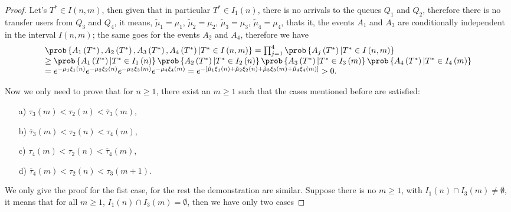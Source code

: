 \begin{proof}
Let's $T^{*}\in I\left(n,m\right)$, then given that in particular $T^{*}\in I_{1}\left(n\right)$, there is no arrivals to the queues $Q_{1}$ and $Q_{2}$, therefore there is no transfer users from $Q_{3}$ and $Q_{4}$, it means, $\tilde{\mu}_{1}=\mu_{1}$, $\tilde{\mu}_{2}=\mu_{2}$, $\tilde{\mu}_{3}=\mu_{3}$, $\tilde{\mu}_{4}=\mu_{4}$, thats it, the events $A_{1}$ and $A_{3}$ are conditionally independent in the interval $I\left(n,m\right)$; the same goes for the events $A_{2}$ and $A_{4}$, therefore we have
\begin{eqnarray}
\begin{array}{l}
\prob\left\{A_{1}\left(T^{*}\right),A_{2}\left(T^{*}\right),
A_{3}\left(T^{*}\right),A_{4}\left(T^{*}\right)|T^{*}\in I\left(n,m\right)\right\}
=\prod_{j=1}^{4}\prob\left\{A_{j}\left(T^{*}\right)|T^{*}\in I\left(n,m\right)\right\}\\
\geq\prob\left\{A_{1}\left(T^{*}\right)|T^{*}\in I_{1}\left(n\right)\right\}
\prob\left\{A_{2}\left(T^{*}\right)|T^{*}\in I_{2}\left(n\right)\right\}
\prob\left\{A_{3}\left(T^{*}\right)|T^{*}\in I_{3}\left(m\right)\right\}
\prob\left\{A_{4}\left(T^{*}\right)|T^{*}\in I_{4}\left(m\right)\right\}\\
=e^{-\mu_{1}\xi_{1}\left(n\right)}
e^{-\mu_{2}\xi_{2}\left(n\right)}
e^{-\mu_{3}\xi_{3}\left(m\right)}
e^{-\mu_{4}\xi_{4}\left(m\right)}
=e^{-\left[\tilde{\mu}_{1}\xi_{1}\left(n\right)
+\tilde{\mu}_{2}\xi_{2}\left(n\right)
+\tilde{\mu}_{3}\xi_{3}\left(m\right)
+\tilde{\mu}_{4}\xi_{4}
\left(m\right)\right]}>0.
\end{array}
\end{eqnarray}

Now we only need to prove that for $n\ge1$, there exist an $m\geq1$ such that the cases mentioned before are satisfied: 

\begin{multicols}{2}
\begin{itemize}
\item[a)] $\tau_{3}\left(m\right)<\tau_{2}\left(n\right)<\overline{\tau}_{3}\left(m\right)$,

\item[b)] $\overline{\tau}_{3}\left(m\right)<\tau_{2}\left(n\right)
<\tau_{4}\left(m\right)$,

\item[c)] $\tau_{4}\left(m\right)<\tau_{2}\left(n\right)<
\overline{\tau}_{4}\left(m\right)$,

\item[d)] $\overline{\tau}_{4}\left(m\right)<\tau_{2}\left(n\right)
<\tau_{3}\left(m+1\right)$.
\end{itemize}
\end{multicols}
We only give the proof for the fist case, for the rest the demonstration are similar. Suppose there is no $m\geq1$, with $I_{1}\left(n\right)\cap I_{3}\left(m\right)\neq\emptyset$, it means that for all $m\geq1$, $I_{1}\left(n\right)\cap I_{3}\left(m\right)=\emptyset$, then we have only two cases


\end{proof}
